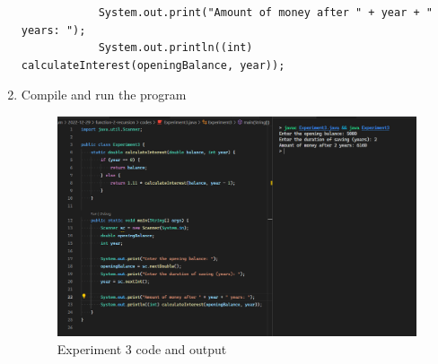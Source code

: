 \documentclass[12pt,titlepage]{article}
\begin{document}
\begin{enumerate}
{        \begin{verbatim}
            System.out.print("Amount of money after " + year + " years: ");
            System.out.println((int) calculateInterest(openingBalance, year));
        \end{verbatim}
    }
    \item {
        Compile and run the program

        \begin{figure}[h]
            \centering
            \includegraphics[width=.8\textwidth]{./images/experiment-three.png}
            \caption{Experiment 3 code and output}
        \end{figure}
    }
\end{enumerate}

\pagebreak
\end{document}

